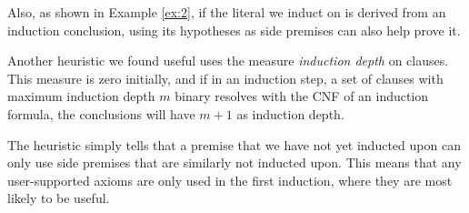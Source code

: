 Also, as shown in Example \ref{ex:2}, if the literal we induct on is derived from an induction conclusion, using its hypotheses as side premises can also help prove it.

Another heuristic we found useful uses the measure \textit{induction depth} on clauses. This measure is zero initially, and if in an induction step, a set of clauses with maximum induction depth $m$ binary resolves with the CNF of an induction formula, the conclusions will have $m+1$ as induction depth.

The heuristic simply tells that a premise that we have not yet inducted upon can only use side premises that are similarly not inducted upon. This means that any user-supported axioms are only used in the first induction, where they are most likely to be useful.
